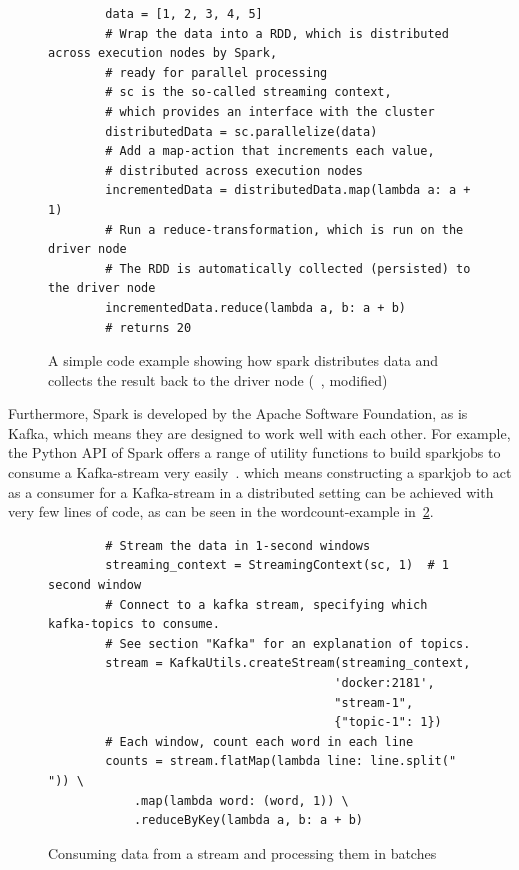 \begin{figure}
    \caption{A simple code example showing how spark distributes data and collects the result back to the driver node (~\cite{sparkDocs}, modified)}
    \label{code:simpleParallelization}
    \begin{verbatim}
        data = [1, 2, 3, 4, 5]
        # Wrap the data into a RDD, which is distributed across execution nodes by Spark,
        # ready for parallel processing
        # sc is the so-called streaming context,
        # which provides an interface with the cluster
        distributedData = sc.parallelize(data)
        # Add a map-action that increments each value,
        # distributed across execution nodes
        incrementedData = distributedData.map(lambda a: a + 1)
        # Run a reduce-transformation, which is run on the driver node
        # The RDD is automatically collected (persisted) to the driver node
        incrementedData.reduce(lambda a, b: a + b)
        # returns 20
    \end{verbatim}
\end{figure}

Furthermore, Spark is developed by the Apache Software Foundation, as is Kafka,
which means they are designed to work well with each other.
For example, the Python API of Spark offers a range of utility functions to build sparkjobs to consume a Kafka-stream very easily~\cite{sparkDocs}.
which means constructing a sparkjob to act as a consumer for a Kafka-stream in a distributed setting can be achieved with very few lines of code,
as can be seen in the wordcount-example in~\ref{code:wordcount}.

\begin{figure}
    \caption{Consuming data from a stream and processing them in batches}
    \label{code:wordcount}
    \begin{verbatim}
        # Stream the data in 1-second windows
        streaming_context = StreamingContext(sc, 1)  # 1 second window
        # Connect to a kafka stream, specifying which kafka-topics to consume.
        # See section "Kafka" for an explanation of topics.
        stream = KafkaUtils.createStream(streaming_context,
                                        'docker:2181',
                                        "stream-1",
                                        {"topic-1": 1})
        # Each window, count each word in each line
        counts = stream.flatMap(lambda line: line.split(" ")) \
            .map(lambda word: (word, 1)) \
            .reduceByKey(lambda a, b: a + b)
    \end{verbatim}
\end{figure}

